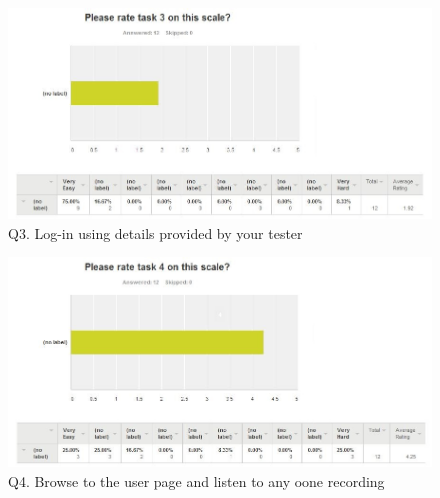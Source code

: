 \documentclass{l3proj}
\begin{document}
\newpage
\begin{figure}[ht!]
\centering
\includegraphics[width=\textwidth]{images/question-3-stats.jpg}
\caption{Q3. Log-in using details provided by your tester}
\end{figure}
\begin{figure}[ht!]
\centering
\includegraphics[width=\textwidth]{images/question-4-stats.jpg}
\caption{Q4. Browse to the user page and listen to any oone recording}
\end{figure}
\end{document}
